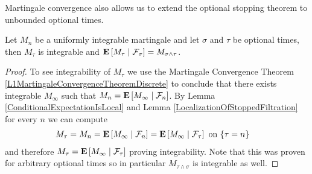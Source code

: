 Martingale convergence also allows us to extend the optional stopping
theorem to unbounded optional times.
\begin{lem}Let $M_n$ be a uniformly integrable martingale and let
  $\sigma$ and $\tau$ be optional times, then $M_\tau$ is integrable
  and $\cexpectationlong{\mathcal{F}_\sigma}{M_\tau} = M_{\sigma
    \wedge \tau}$.
\end{lem}
\begin{proof}
To see integrability of $M_\tau$ we use the Martingale Convergence
Theorem \ref{L1MartingaleConvergenceTheoremDiscrete} to conclude that
there exists integrable $M_\infty$ such that $M_n =
\cexpectationlong{\mathcal{F}_n}{M_\infty}$.  By Lemma
\ref{ConditionalExpectationIsLocal} and Lemma
\ref{LocalizationOfStoppedFiltration} for every $n$ we can compute
\begin{align*}
M_\tau &= M_n = \cexpectationlong{\mathcal{F}_n}{M_\infty} =
\cexpectationlong{\mathcal{F}_\tau}{M_\infty} \text{ on
  $\lbrace \tau = n \rbrace$}
\end{align*}
and therefore $M_\tau = \cexpectationlong{\mathcal{F}_\tau}{M_\infty}
$ proving integrability.  Note that this was proven for arbitrary
optional times so in particular $M_{\tau \wedge \sigma}$ is integrable
as well.


\end{proof}
